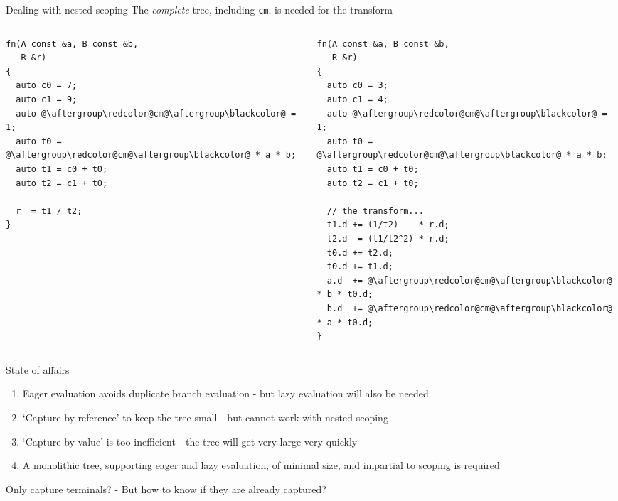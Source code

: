 \documentclass[xcolor=dvipsnames]{beamer}
\begin{document}
\begin{frame}[fragile]{Dealing with nested scoping}
The \emph{complete} tree, including {\color{red}\texttt{cm}}, is needed for the transform
  \begin{columns}[T] %
    \begin{column}{0.44\textwidth}
      \begin{lstlisting}
fn(A const &a, B const &b,
   R &r)
{
  auto c0 = 7;
  auto c1 = 9;
  auto @\aftergroup\redcolor@cm@\aftergroup\blackcolor@ = 1;
  auto t0 = @\aftergroup\redcolor@cm@\aftergroup\blackcolor@ * a * b;
  auto t1 = c0 + t0;
  auto t2 = c1 + t0;

  r  = t1 / t2;
}
  \end{lstlisting}
    \end{column}%
    \hfill%
    \begin{column}{0.56\textwidth}
        \begin{lstlisting}
fn(A const &a, B const &b,
   R &r)
{
  auto c0 = 3;
  auto c1 = 4;
  auto @\aftergroup\redcolor@cm@\aftergroup\blackcolor@ = 1;
  auto t0 = @\aftergroup\redcolor@cm@\aftergroup\blackcolor@ * a * b;
  auto t1 = c0 + t0;
  auto t2 = c1 + t0;

  // the transform...
  t1.d += (1/t2)    * r.d;
  t2.d -= (t1/t2^2) * r.d;
  t0.d += t2.d;
  t0.d += t1.d;
  a.d  += @\aftergroup\redcolor@cm@\aftergroup\blackcolor@ * b * t0.d;
  b.d  += @\aftergroup\redcolor@cm@\aftergroup\blackcolor@ * a * t0.d;
}
  \end{lstlisting}
    \end{column}%
  \end{columns}
\end{frame}


\begin{frame}[fragile]{State of affairs}
  \begin{enumerate}
  \item Eager evaluation avoids duplicate branch evaluation - but lazy evaluation will also be needed \vspace{5mm}
  \item `Capture by reference' to keep the tree small - but cannot work with nested scoping \vspace{5mm}
  \item `Capture by value' is too inefficient - the tree will get very large very quickly \vspace{5mm}
  \item A monolithic tree, supporting eager and lazy evaluation, of minimal size, and impartial to scoping is required \vspace{5mm}
  \end{enumerate}
  {\color{blue}Only capture terminals? - But how to know if they are already captured?} \vspace{5mm}
\end{frame}
\end{document}
